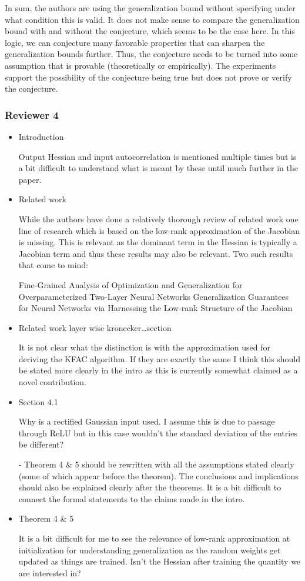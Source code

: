 \documentclass[12pt]{colt2022} %
\begin{document}
In sum, the authors are using the generalization bound without specifying under what condition this is valid. It does not make sense to compare the generalization bound with and without the conjecture, which seems to be the case here. In this logic, we can conjecture many favorable properties that can sharpen the generalization bounds further. Thus, the conjecture needs to be turned into some assumption that is provable (theoretically or empirically). The experiments support the possibility of the conjecture being true but does not prove or verify the conjecture.


\subsubsection*{ Reviewer 4 }

\begin{itemize}
\item Introduction

Output Hessian and input autocorrelation is mentioned multiple times but is a bit difficult to understand what is meant by these until much further in the paper.

\item Related work

While the authors have done a relatively thorough review of related work one line of research which is based on the low-rank approximation of the Jacobian is missing. This is relevant as the dominant term in the Hessian is typically a Jacobian term and thus these results may also be relevant. Two such results that come to mind:

Fine-Grained Analysis of Optimization and Generalization for Overparameterized Two-Layer Neural Networks
 Generalization Guarantees for Neural Networks via Harnessing the Low-rank Structure of the Jacobian


\item Related work layer wise kronecker…section

It is not clear what the distinction is with the approximation used for deriving the KFAC algorithm. If they are exactly the same I think this should be stated more clearly in the intro as this is currently somewhat claimed as a novel contribution.
\item Section 4.1

Why is a rectified Gaussian input used. I assume this is due to passage through ReLU but in this case wouldn’t the standard deviation of the entries be different?

- Theorem 4 \& 5 should be rewritten with all the assumptions stated clearly (some of which appear before the theorem). The conclusions and implications should also be explained clearly after the theorems. It is a bit difficult to connect the formal statements to the claims made in the intro.

\item Theorem 4 \& 5

It is a bit difficult for me to see the relevance of low-rank approximation at initialization for understanding generalization as the random weights get updated as things are trained. Isn’t the Hessian after training the quantity we are interested in?
\end{itemize}
\end{document}
